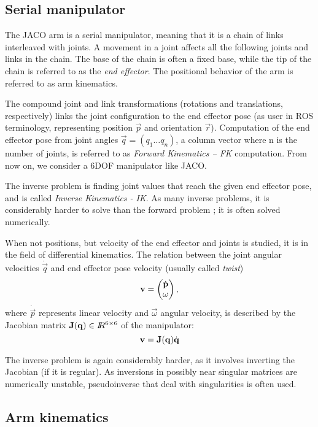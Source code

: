 \documentclass[buriama8_dp.tex]{subfiles}
\begin{document}
\subsection{Serial manipulator}
\label{subsec:arm_theory}

The JACO arm is a serial manipulator, meaning that it is a chain of links interleaved with joints. A movement in a joint affects all the following joints and links in the chain. The base of the chain is often a fixed base, while the tip of the chain is referred to as the \emph{end effector}. The positional behavior of the arm is referred to as arm kinematics.

The compound joint and link transformations (rotations and translations, respectively) links the joint configuration to the end effector pose (as user in ROS terminology, representing position \(\vec p\) and orientation \(\vec r\)). Computation of the end effector pose from joint angles \(\vec q = (q_1 \ldots q_n)\), a column vector where \m n is the number of joints, is referred to as \emph{Forward Kinematics -- FK} computation. From now on, we consider a 6DOF manipulator like JACO.

The inverse problem is finding joint values that reach the given end effector pose, and is called \emph{Inverse Kinematics - IK}. As many inverse problems, it is considerably harder to solve than the forward problem \cite[sec. 2.12]{manipulators}; it is often solved numerically.

When not positions, but velocity of the end effector and joints is studied, it is in the field of differential kinematics. The relation between the joint angular velocities \(\dot{\vec q}\) and end effector pose velocity (usually called \emph{twist})
\[\vec v = \colvec{\dot{\vec p}}{\vec \omega},\]
where \(\dot{\vec p}\) represents linear velocity and \(\vec \omega\) angular velocity, is described by the Jacobian matrix \(\mathbf{J}(\mathbf{q}) \in I\!\!R^{6 \times 6}\) of the manipulator:
\[
  \mathbf{v} = \mathbf{J}(\mathbf{q})\dot{\mathbf{q}}
\]

The inverse problem is again considerably harder, as it involves inverting the Jacobian (if it is regular). As inversions in possibly near singular matrices are numerically unstable, pseudoinverse that deal with singularities is often used.

\subsection{Arm kinematics}
\label{subsec:arm_kinematics}
\end{document}
